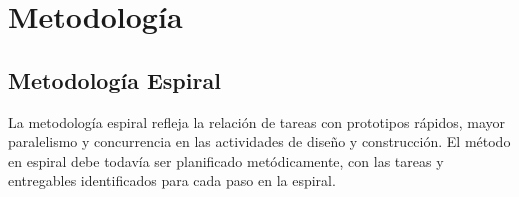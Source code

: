\chapter{Metodología}
\section{Metodología Espiral}
La metodología espiral refleja la relación de tareas con prototipos rápidos, mayor paralelismo y concurrencia en las actividades de diseño y construcción. El método en espiral debe todavía ser planificado metódicamente, con las tareas y entregables identificados para cada paso en la espiral.